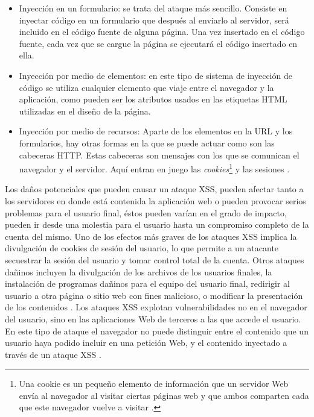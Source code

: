 \begin{itemize}
	\item Inyección en un formulario: se trata del ataque más sencillo. Consiste en inyectar código en un formulario que después al
enviarlo al servidor, será incluido en el código fuente de alguna página. Una vez insertado en el código fuente, cada vez
que se cargue la página se ejecutará el código insertado en ella.

	\item Inyección por medio de elementos: en este tipo de sistema de inyección de código se utiliza cualquier elemento que viaje
entre el navegador y la aplicación, como pueden ser los atributos usados en las etiquetas HTML utilizadas en el diseño de
la página.

	\item Inyección por medio de recursos: Aparte de los elementos en la URL y los formularios, hay otras formas en la que se
puede actuar como son las cabeceras HTTP. Estas cabeceras son mensajes con los que se comunican el navegador y el
servidor. Aquí entran en juego las \textit{cookies}\footnote{Una cookie es un pequeño elemento de información que un servidor Web envía al navegador al visitar ciertas páginas web y que ambos comparten cada que este navegador vuelve a visitar \cite{cookie}.} y las sesiones \cite{ocho}.\\
\end{itemize}

Los daños potenciales que pueden causar un ataque XSS, pueden afectar tanto a los servidores en donde está contenida la
aplicación web o pueden provocar serios problemas para el usuario final, éstos pueden varían en el grado de impacto, pueden ir
desde una molestia para el usuario hasta un compromiso completo de la cuenta del mismo. Uno de los efectos más graves de los
ataques XSS implica la divulgación de cookies de sesión del usuario, lo que permite a un atacante secuestrar la sesión del usuario y
tomar control total de la cuenta. Otros ataques dañinos incluyen la divulgación de los archivos de los usuarios finales, la instalación
de programas dañinos para el equipo del usuario final, redirigir al usuario a otra página o sitio web con fines malicioso, o modificar
la presentación de los contenidos \cite{nueve}. Los ataques XSS explotan vulnerabilidades no en el navegador del usuario, sino en las
aplicaciones Web de terceros a las que accede el usuario. En este tipo de ataque el navegador no puede distinguir entre el contenido
que un usuario haya podido incluir en una petición Web, y el contenido inyectado a través de un ataque XSS \cite{diez}.\\